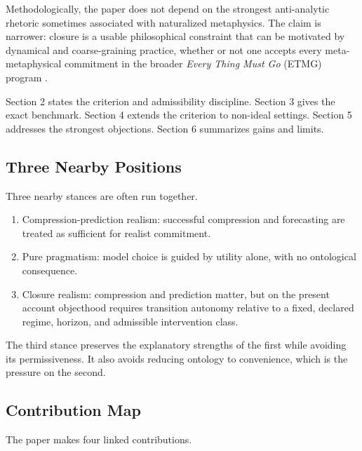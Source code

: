 Methodologically, the paper does not depend on the strongest
anti-analytic rhetoric sometimes associated with naturalized
metaphysics. The claim is narrower: closure is a usable philosophical
constraint that can be motivated by dynamical and coarse-graining
practice, whether or not one accepts every meta-metaphysical commitment
in the broader \emph{Every Thing Must Go} (ETMG) program \citep{ladyman2007}.

Section 2 states the criterion and admissibility
discipline. Section 3 gives the exact benchmark. Section 4 extends the
criterion to non-ideal settings. Section 5 addresses the strongest
objections. Section 6 summarizes gains and limits.

\subsection{Three Nearby Positions}\label{three-nearby-positions}

Three nearby stances are often run together.

\begin{enumerate}
	\item
	      Compression-prediction realism: successful compression and forecasting
	      are treated as sufficient for realist commitment.
	\item
	      Pure pragmatism: model choice is guided by utility alone, with no
	      ontological consequence.
	\item
	      Closure realism: compression and prediction matter, but on the
	      present account objecthood requires transition autonomy relative to a fixed, declared regime, horizon, and admissible intervention class.
\end{enumerate}

The third stance preserves the explanatory strengths of the first while
avoiding its permissiveness. It also avoids reducing ontology to
convenience, which is the pressure on the second.

\subsection{Contribution Map}\label{contribution-map}

The paper makes four linked contributions.

